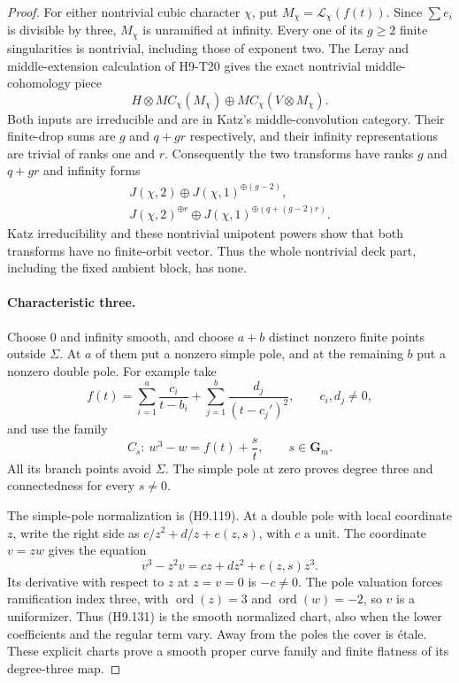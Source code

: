 \begin{proof}
For either nontrivial cubic character $\chi$,
put $M_\chi=\mathcal L_\chi(f(t))$. Since
$\sum e_i$ is divisible by three, $M_\chi$
is unramified at infinity. Every one of its
$g\ge2$ finite singularities is nontrivial,
including those of exponent two. The Leray and
middle-extension calculation of H9-T20 gives
the exact nontrivial middle-cohomology piece
\[
       H\otimes MC_\chi(M_\chi)
                    \oplus MC_\chi(V\otimes M_\chi).
                                                               \tag{H9.128}
\]
Both inputs are irreducible and are in Katz's
middle-convolution category. Their finite-drop
sums are $g$ and $q+gr$ respectively, and their
infinity representations are trivial of ranks
one and $r$. Consequently the two transforms
have ranks $g$ and $q+gr$ and infinity forms
\[
 \begin{split}
       J(\chi,2)\oplus J(\chi,1)^{\oplus(g-2)},\\
       J(\chi,2)^{\oplus r}
                \oplus J(\chi,1)^{\oplus(q+(g-2)r)}.
 \end{split}                                                  \tag{H9.129}
\]
Katz irreducibility and these nontrivial
unipotent powers show that both transforms
have no finite-orbit vector. Thus the whole
nontrivial deck part, including the fixed
ambient block, has none.

\paragraph{Characteristic three.}
Choose $0$ and infinity smooth, and choose
$a+b$ distinct nonzero finite points outside
$\Sigma$. At $a$ of them put a nonzero simple
pole, and at the remaining $b$ put a nonzero
double pole. For example take
\[
 f(t)=\sum_{i=1}^{a}\frac{c_i}{t-b_i}
          +\sum_{j=1}^{b}\frac{d_j}{(t-c_j')^2},
 \qquad c_i,d_j\ne0,
\]
and use the family
\[
                   C_s:\ w^3-w=f(t)+\frac{s}{t},
                           \qquad s\in\mathbf G_m.
                                                               \tag{H9.130}
\]
All its branch points avoid $\Sigma$. The
simple pole at zero proves degree three and
connectedness for every $s\ne0$.

The simple-pole normalization is (H9.119).
At a double pole with local coordinate $z$,
write the right side as
$c/z^2+d/z+e(z,s)$, with $c$ a unit. The
coordinate $v=z w$ gives the equation
\[
          v^3-z^2v=c z+d z^2+e(z,s)z^3.
                                                               \tag{H9.131}
\]
Its derivative with respect to $z$ at
$z=v=0$ is $-c\ne0$. The pole valuation
forces ramification index three, with
$\operatorname{ord}(z)=3$ and
$\operatorname{ord}(w)=-2$, so $v$ is a
uniformizer. Thus (H9.131) is the smooth
normalized chart, also when the lower
coefficients and the regular term vary.
Away from the poles the cover is \'etale.
These explicit charts prove a smooth proper
curve family and finite flatness of its
degree-three map.


\end{proof}
